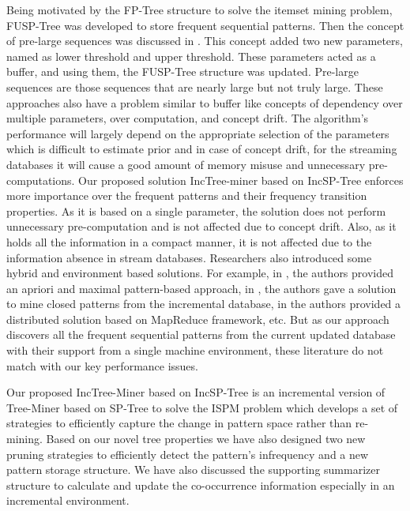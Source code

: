 Being motivated by the FP-Tree\cite{grahne2005fast} structure to solve the itemset mining problem, FUSP-Tree was developed to store frequent sequential patterns. Then the concept of pre-large sequences was discussed in \cite{hong2001new,hong2011incremental,lin2015incrementally}. This concept added two new parameters, named as lower threshold and upper threshold. These parameters acted as a buffer, and using them, the FUSP-Tree structure was updated. Pre-large sequences are those sequences that are nearly large but not truly large. These approaches also have a problem similar to buffer like concepts of dependency over multiple parameters, over computation, and concept drift. The algorithm’s performance will largely depend on the appropriate selection of the parameters which is difficult to estimate prior and in case of concept drift, for the streaming databases it will cause a good amount of memory misuse and unnecessary pre-computations. Our proposed solution IncTree-miner based on IncSP-Tree enforces more importance over the frequent patterns and their frequency transition properties. As it is based on a single parameter, the solution does not perform unnecessary pre-computation and is not affected due to concept drift. Also, as it holds all the information in a compact manner, it is not affected due to the information absence in stream databases. Researchers also introduced some hybrid and environment based solutions. For example, in \cite{lin2007discover}, the authors provided an apriori and maximal pattern-based approach, in \cite{chang2007imcs}, the authors gave a solution to mine closed patterns from the incremental database, in \cite{saleti2019mapreduce} the authors provided a distributed solution based on MapReduce framework, etc. But as our approach discovers all the frequent sequential patterns from the current updated database with their support from a single machine environment, these literature do not match with our key performance issues.

 

Our proposed IncTree-Miner based on IncSP-Tree is an incremental version of Tree-Miner based on SP-Tree to solve the ISPM problem which develops a set of strategies to efficiently capture the change in pattern space rather than re-mining. Based on our novel tree properties we have also designed two new pruning strategies to efficiently detect the pattern's infrequency and a new pattern storage structure. We have also discussed the supporting summarizer structure to calculate and update the co-occurrence information especially in an incremental environment.

